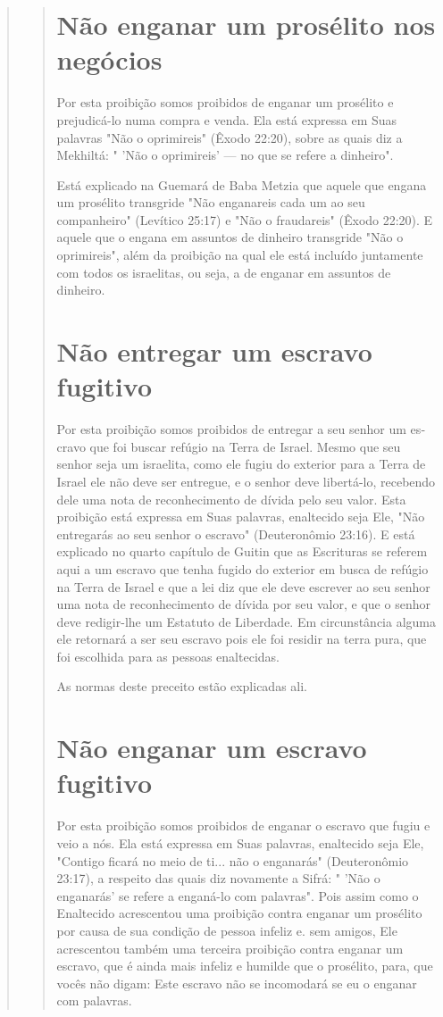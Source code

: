 \begin{quote}
\begin{quote}
\section{Não enganar um prosélito nos negócios}

Por esta proibição somos proibidos de enganar um prosélito e
prejudicá-lo numa compra e venda. Ela está expressa em Suas palavras
"Não o oprimireis" (Êxodo 22:20), sobre as quais diz a Mekhiltá: 
" 'Não o
oprimireis' --- no que se refere a dinheiro".

Está explicado na Guemará de Baba Metzia que aquele que engana um
prosélito transgride "Não enganareis cada um ao seu companheiro"
(Leví­tico 25:17) e "Não o fraudareis" (Êxodo 22:20). E aquele que o
engana em as­suntos de dinheiro transgride "Não o oprimireis", além da
proibição na qual ele está incluído juntamente com todos os israelitas,
ou seja, a de enganar em assuntos de dinheiro.

\section{Não entregar um escravo fugitivo}

Por esta proibição somos proibidos de entregar a seu senhor um es­cravo
que foi buscar refúgio na Terra de Israel. Mesmo que seu senhor seja um
israelita, como ele fugiu do exterior para a Terra de Israel ele não
deve ser en­tregue, e o senhor deve libertá-lo, recebendo dele uma nota
de reconhecimen­to de dívida pelo seu valor. Esta proibição está
expressa em Suas palavras, enal­tecido seja Ele, "Não entregarás ao seu
senhor o escravo" (Deuteronômio 23:16). E está explicado no quarto
capítulo de Guitin que as Escrituras se referem aqui a um escravo que
tenha fugido do exterior em busca de refúgio na Terra de Israel e que a
lei diz que ele deve escrever ao seu senhor uma nota de reconhe­cimento
de dívida por seu valor, e que o senhor deve redigir-lhe um Estatuto de
Liberdade. Em circunstância alguma ele retornará a ser seu escravo pois
ele foi residir na terra pura, que foi escolhida para as pessoas
enaltecidas.

As normas deste preceito estão explicadas ali.

\section{Não enganar um escravo fugitivo}

Por esta proibição somos proibidos de enganar o escravo que fugiu e veio
a nós. Ela está expressa em Suas palavras, enaltecido seja Ele, "Contigo
ficará no meio de ti... não o enganarás" (Deuteronômio 23:17), a
respeito das quais diz novamente a Sifrá: " 'Não o enganarás' se refere
a enganá-lo com pa­lavras". Pois assim como o Enaltecido acrescentou uma
proibição contra enga­nar um prosélito por causa de sua condição de
pessoa infeliz e. sem amigos, Ele acrescentou também uma terceira
proibição contra enganar um escravo, que é ainda mais infeliz e humilde
que o prosélito, para, que vocês não digam: Este escravo não se
incomodará se eu o enganar com palavras.


\end{quote}
\end{quote}
